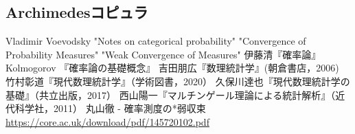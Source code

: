 \documentclass[uplatex,dvipdfmx]{jsreport}
\begin{document}
\subsection{Archimedesコピュラ}


\begin{thebibliography}{99}
    Vladimir Voevodsky "Notes on categorical probability"
    "Convergence of Probability Measures"
    "Weak Convergence of Measures"
    伊藤清『確率論』
    Kolmogorov 『確率論の基礎概念』
    吉田朋広『数理統計学』(朝倉書店，2006)
    竹村彰道『現代数理統計学』（学術図書，2020）
    久保川達也『現代数理統計学の基礎』（共立出版，2017）
    西山陽一『マルチンゲール理論による統計解析』（近代科学社，2011）
    丸山徹 - 確率測度の*弱収束\url{https://core.ac.uk/download/pdf/145720102.pdf}
\end{thebibliography}
\end{document}
